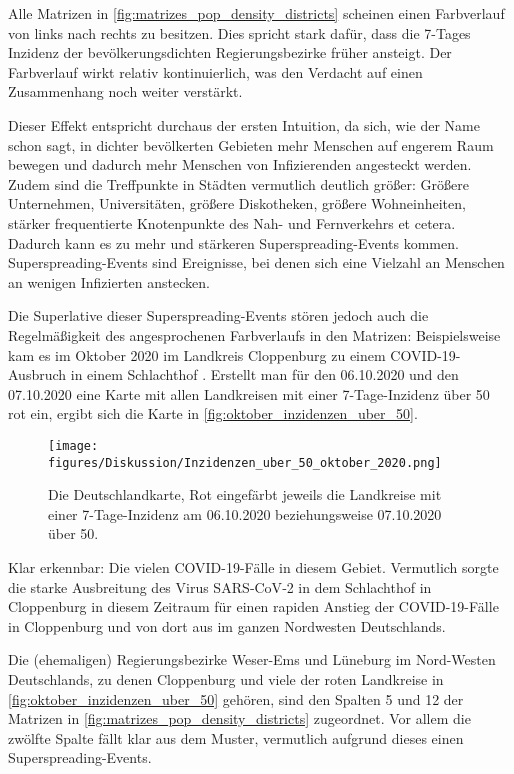 Alle Matrizen in \autoref{fig:matrizes_pop_density_districts} scheinen einen Farbverlauf von links nach rechts zu besitzen. Dies spricht stark dafür, dass die 7-Tages Inzidenz der bevölkerungsdichten Regierungsbezirke früher ansteigt. Der Farbverlauf wirkt relativ kontinuierlich, was den Verdacht auf einen Zusammenhang noch weiter verstärkt.

Dieser Effekt entspricht durchaus der ersten Intuition, da sich, wie der Name schon sagt, in dichter bevölkerten Gebieten mehr Menschen auf engerem Raum bewegen und dadurch mehr Menschen von Infizierenden angesteckt werden.
Zudem sind die Treffpunkte in Städten vermutlich deutlich größer: Größere Unternehmen, Universitäten, größere Diskotheken, größere Wohneinheiten, stärker frequentierte Knotenpunkte des Nah- und Fernverkehrs et cetera. Dadurch kann es zu mehr und stärkeren Superspreading-Events kommen. Superspreading-Events sind Ereignisse, bei denen sich eine Vielzahl an Menschen an wenigen Infizierten anstecken.

Die Superlative dieser Superspreading-Events stören jedoch auch die Regelmäßigkeit des angesprochenen Farbverlaufs in den Matrizen: Beispielsweise kam es im Oktober 2020 im Landkreis Cloppenburg zu einem COVID-19-Ausbruch in einem Schlachthof \autocite{Zeitartikel}. Erstellt man für den 06.10.2020 und den 07.10.2020 eine Karte mit allen Landkreisen mit einer 7-Tage-Inzidenz über 50 rot ein, ergibt sich die Karte in \autoref{fig:oktober_inzidenzen_uber_50}.

\begin{figure}[H]
    \centering
    \texttt{[image: figures/Diskussion/Inzidenzen\_uber\_50\_oktober\_2020.png]}
    \caption{Die Deutschlandkarte, Rot eingefärbt jeweils die Landkreise mit einer 7-Tage-Inzidenz am 06.10.2020 beziehungsweise 07.10.2020 über 50.}
    \label{fig:oktober_inzidenzen_uber_50}
\end{figure}
Klar erkennbar: Die vielen COVID-19-Fälle in diesem Gebiet. Vermutlich sorgte die starke Ausbreitung des Virus SARS‑CoV‑2 in dem Schlachthof in Cloppenburg in diesem Zeitraum für einen rapiden Anstieg der COVID-19-Fälle in Cloppenburg und von dort aus im ganzen Nordwesten Deutschlands.

Die (ehemaligen) Regierungsbezirke Weser-Ems und Lüneburg im Nord-Westen Deutschlands, zu denen Cloppenburg und viele der roten Landkreise in \autoref{fig:oktober_inzidenzen_uber_50} gehören, sind den Spalten 5 und 12 der Matrizen in \autoref{fig:matrizes_pop_density_districts} zugeordnet. Vor allem die zwölfte Spalte fällt klar aus dem Muster, vermutlich aufgrund dieses einen Superspreading-Events.

